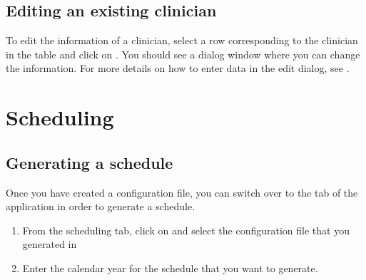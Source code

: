 \documentclass[letterpaper,10pt,english]{sphinxmanual}
\begin{document}
\begin{figure}[h!]
\centering
{}\end{figure}


\subsection{Editing an existing clinician}
\label{\detokenize{index:editing-an-existing-clinician}}
To edit the information of a clinician, select a row corresponding
to the clinician in the table and click on . You should
see a dialog window where you can change the information. For more
details on how to enter data in the edit dialog, see {\hyperref[\detokenize{index:adding-a-new-clinician}]{}}.

\begin{figure}[h!]
\centering
{}\end{figure}


\section{Scheduling}
\label{\detokenize{index:scheduling}}

\subsection{Generating a schedule}
\label{\detokenize{index:generating-a-schedule}}\label{\detokenize{index:id5}}
Once you have created a configuration file, you can switch over to the
 tab of the application in order to generate a schedule.
\begin{enumerate}
\item {} 
From the scheduling tab, click on  and select the configuration
file that you generated in {\hyperref[\detokenize{index:clinician-configuration}]{}}

\end{enumerate}

\begin{figure}[h!]
\centering
{}\end{figure}
\begin{enumerate}
\setcounter{enumi}{1}
\item {} 
Enter the calendar year for the schedule that you want to generate.

\end{enumerate}
\end{document}
